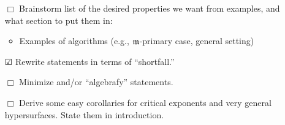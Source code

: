\documentclass[11pt]{amsart}
\begin{document}
{\begin{enumerate}
\item[$\Box$]  Brainstorm list of the desired properties we want from examples, and what section to put them in: 
\begin{itemize}
   \item Examples of algorithms (e.g., $\mathfrak{m}$-primary case, general setting)
\end{itemize}
\item[$\CheckedBox$] Rewrite statements in terms of ``shortfall.''
 \item[$\Box$] Minimize and/or ``algebrafy'' statements.
 \item[$\Box$] Derive some easy corollaries for critical exponents and very general hypersurfaces.  State them in introduction. 


\end{enumerate}}
\end{document}
